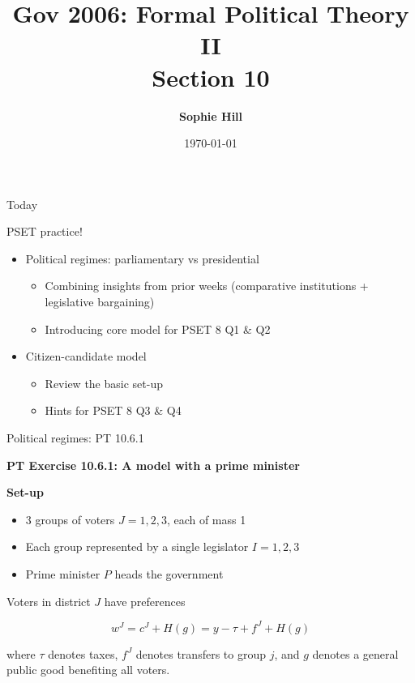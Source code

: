 \documentclass[11pt,aspectratio=169]{beamer}
\title{Gov 2006: Formal Political Theory II \\
Section 10}
\date{\today}
\author{ \textbf{Sophie Hill}}
\begin{document}
  \maketitle
  
\begin{frame}{Today}

\Large

PSET practice!

\pause

\begin{itemize}
\setlength{\itemsep}{1em}
\item Political regimes: parliamentary vs presidential
\begin{itemize}
\large
\item Combining insights from prior weeks (comparative institutions + legislative bargaining)
\item Introducing core model for PSET 8 Q1 \& Q2 
\end{itemize}

\pause

\item Citizen-candidate model
\begin{itemize}
\large
\item Review the basic set-up
\item Hints for PSET 8 Q3 \& Q4 \\
\end{itemize}
\end{itemize}

\end{frame}
\begin{frame}{Political regimes: PT 10.6.1}

\textbf{PT Exercise 10.6.1: A model with a prime minister}

\textbf{Set-up}

\begin{itemize}
\item 3 groups of voters $J = 1, 2, 3$, each of mass 1
\item Each group represented by a single legislator $I=1,2,3$
\item Prime minister $P$ heads the government
\end{itemize}

\pause


Voters in district $J$ have preferences

$$ w^{J}=c^{J}+H(g)=y-\tau+f^{J}+H(g) $$

where $\tau$ denotes taxes, $f^J$ denotes transfers to group $j$, and $g$ denotes a general public good benefiting all voters.
\end{frame}
\end{document}

